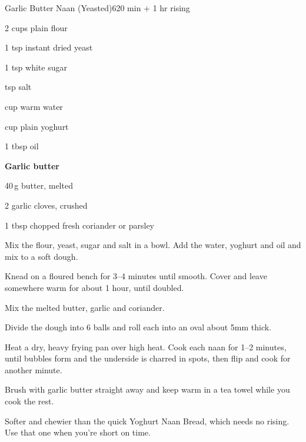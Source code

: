 \begin{recipebox}{Garlic Butter Naan (Yeasted)}{6}{20 min + 1 hr rising}
\begin{ingredients}
  \item 2 cups plain flour
  \item 1 tsp instant dried yeast
  \item 1 tsp white sugar
  \item {} tsp salt
  \item {} cup warm water
  \item {} cup plain yoghurt
  \item 1 tbsp oil
  \item[] \textbf{Garlic butter}
  \item 40\,g butter, melted
  \item 2 garlic cloves, crushed
  \item 1 tbsp chopped fresh coriander or parsley
\end{ingredients}

\begin{method}
  \item Mix the flour, yeast, sugar and salt in a bowl. Add the water, yoghurt and oil and mix to a soft dough.
  \item Knead on a floured bench for 3--4 minutes until smooth. Cover and leave somewhere warm for about 1 hour, until doubled.
  \item Mix the melted butter, garlic and coriander.
  \item Divide the dough into 6 balls and roll each into an oval about 5mm thick.
  \item Heat a dry, heavy frying pan over high heat. Cook each naan for 1--2 minutes, until bubbles form and the underside is charred in spots, then flip and cook for another minute.
  \item Brush with garlic butter straight away and keep warm in a tea towel while you cook the rest.
\end{method}

\begin{notes}
Softer and chewier than the quick Yoghurt Naan Bread, which needs no rising. Use that one when you're short on time.
\end{notes}
\end{recipebox}
